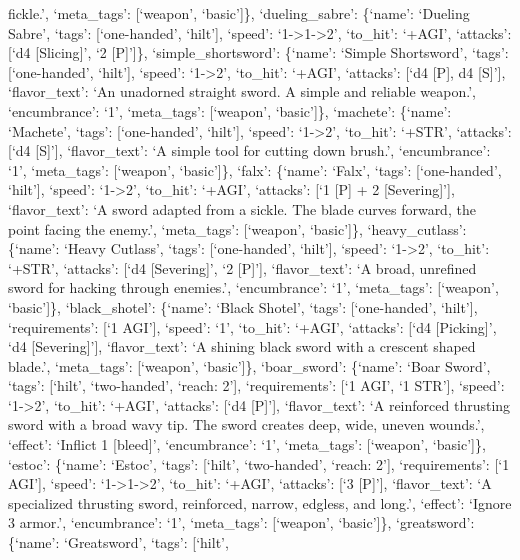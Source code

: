 \documentclass[
  letterpaper,
  DIV=11,
  numbers=noendperiod]{scrartcl}
\begin{document}
fickle.', `meta\_tags': {[}`weapon', `basic'{]}\}, `dueling\_sabre':
\{`name': `Dueling Sabre', `tags': {[}`one-handed', `hilt'{]}, `speed':
`1-\textgreater1-\textgreater2', `to\_hit': `+AGI', `attacks': {[}`d4
{[}Slicing{]}', `2 {[}P{]}'{]}\}, `simple\_shortsword': \{`name':
`Simple Shortsword', `tags': {[}`one-handed', `hilt'{]}, `speed':
`1-\textgreater2', `to\_hit': `+AGI', `attacks': {[}`d4 {[}P{]}, d4
{[}S{]}'{]}, `flavor\_text': `An unadorned straight sword. A simple and
reliable weapon.', `encumbrance': `1', `meta\_tags': {[}`weapon',
`basic'{]}\}, `machete': \{`name': `Machete', `tags': {[}`one-handed',
`hilt'{]}, `speed': `1-\textgreater2', `to\_hit': `+STR', `attacks':
{[}`d4 {[}S{]}'{]}, `flavor\_text': `A simple tool for cutting down
brush.', `encumbrance': `1', `meta\_tags': {[}`weapon', `basic'{]}\},
`falx': \{`name': `Falx', `tags': {[}`one-handed', `hilt'{]}, `speed':
`1-\textgreater2', `to\_hit': `+AGI', `attacks': {[}`1 {[}P{]} + 2
{[}Severing{]}'{]}, `flavor\_text': `A sword adapted from a sickle. The
blade curves forward, the point facing the enemy.', `meta\_tags':
{[}`weapon', `basic'{]}\}, `heavy\_cutlass': \{`name': `Heavy Cutlass',
`tags': {[}`one-handed', `hilt'{]}, `speed': `1-\textgreater2',
`to\_hit': `+STR', `attacks': {[}`d4 {[}Severing{]}', `2 {[}P{]}'{]},
`flavor\_text': `A broad, unrefined sword for hacking through enemies.',
`encumbrance': `1', `meta\_tags': {[}`weapon', `basic'{]}\},
`black\_shotel': \{`name': `Black Shotel', `tags': {[}`one-handed',
`hilt'{]}, `requirements': {[}`1 AGI'{]}, `speed': `1', `to\_hit':
`+AGI', `attacks': {[}`d4 {[}Picking{]}', `d4 {[}Severing{]}'{]},
`flavor\_text': `A shining black sword with a crescent shaped blade.',
`meta\_tags': {[}`weapon', `basic'{]}\}, `boar\_sword': \{`name': `Boar
Sword', `tags': {[}`hilt', `two-handed', `reach: 2'{]}, `requirements':
{[}`1 AGI', `1 STR'{]}, `speed': `1-\textgreater2', `to\_hit': `+AGI',
`attacks': {[}`d4 {[}P{]}'{]}, `flavor\_text': `A reinforced thrusting
sword with a broad wavy tip. The sword creates deep, wide, uneven
wounds.', `effect': `Inflict 1 {[}bleed{]}', `encumbrance': `1',
`meta\_tags': {[}`weapon', `basic'{]}\}, `estoc': \{`name': `Estoc',
`tags': {[}`hilt', `two-handed', `reach: 2'{]}, `requirements': {[}`1
AGI'{]}, `speed': `1-\textgreater1-\textgreater2', `to\_hit': `+AGI',
`attacks': {[}`3 {[}P{]}'{]}, `flavor\_text': `A specialized thrusting
sword, reinforced, narrow, edgless, and long.', `effect': `Ignore 3
armor.', `encumbrance': `1', `meta\_tags': {[}`weapon', `basic'{]}\},
`greatsword': \{`name': `Greatsword', `tags': {[}`hilt',
\end{document}
